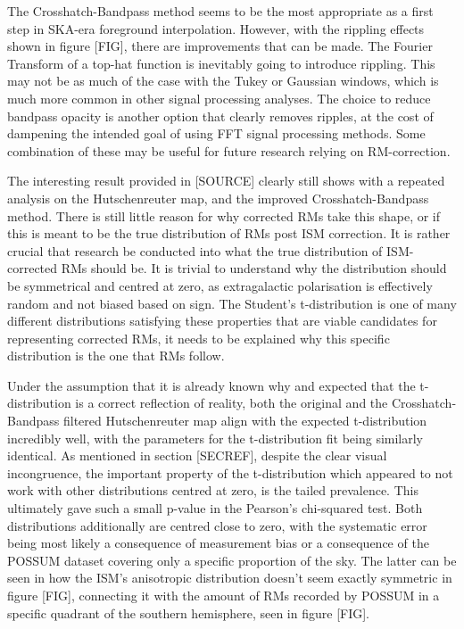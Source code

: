 The Crosshatch-Bandpass method seems to be the most appropriate as a first step in SKA-era foreground interpolation. However, with the rippling effects shown in figure [FIG], there are improvements that can be made. The Fourier Transform of a top-hat function is inevitably going to introduce rippling. This may not be as much of the case with the Tukey or Gaussian windows, which is much more common in other signal processing analyses. The choice to reduce bandpass opacity is another option that clearly removes ripples, at the cost of dampening the intended goal of using FFT signal processing methods. Some combination of these may be useful for future research relying on RM-correction.


The interesting result provided in [SOURCE] clearly still shows with a repeated analysis on the Hutschenreuter map, and the improved Crosshatch-Bandpass method. There is still little reason for why corrected RMs take this shape, or if this is meant to be the true distribution of RMs post ISM correction. It is rather crucial that research be conducted into what the true distribution of ISM-corrected RMs should be. It is trivial to understand why the distribution should be symmetrical and centred at zero, as extragalactic polarisation is effectively random and not biased based on sign. The Student's t-distribution is one of many different distributions satisfying these properties that are viable candidates for representing corrected RMs, it needs to be explained why this specific distribution is the one that RMs follow.


Under the assumption that it is already known why and expected that the t-distribution is a correct reflection of reality, both the original and the Crosshatch-Bandpass filtered Hutschenreuter map align with the expected t-distribution incredibly well, with the parameters for the t-distribution fit being similarly identical. As mentioned in section [SECREF], despite the clear visual incongruence, the important property of the t-distribution which appeared to not work with other distributions centred at zero, is the tailed prevalence. This ultimately gave such a small p-value in the Pearson's chi-squared test. Both distributions additionally are centred close to zero, with the systematic error being most likely a consequence of measurement bias or a consequence of the POSSUM dataset covering only a specific proportion of the sky. The latter can be seen in how the ISM's anisotropic distribution doesn't seem exactly symmetric in figure [FIG], connecting it with the amount of RMs recorded by POSSUM in a specific quadrant of the southern hemisphere, seen in figure [FIG].


